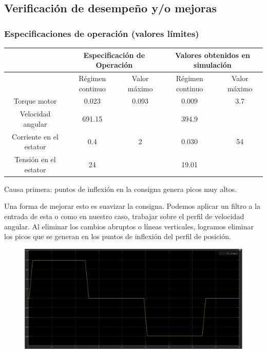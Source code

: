 \documentclass{article}
\begin{document}

\subsection{Verificación de desempeño y/o mejoras}


\subsubsection{Especificaciones de operación (valores límites)}

\begin{center}
    \begin{tabular}{|c|c|c|c|c|}
        \hline
         & \multicolumn{2}{c|}{Especificación de Operación} & \multicolumn{2}{c|}{Valores obtenidos en simulación} \\
        \hline
         & Régimen continuo & Valor máximo & Régimen continuo & Valor máximo \\
        \hline
        Torque motor & 0.023 & 0.093 & 0.009 & 3.7 \\
        \hline
        Velocidad angular & 691.15 &  & 394.9 &  \\
        \hline
        Corriente en el estator & 0.4 & 2 & 0.030 & 54 \\
        \hline
        Tensión en el estator & 24 &  & 19.01 &\\
        \hline
    \end{tabular}
\end{center}

Causa primera: puntos de inflexión en la consigna genera picos muy altos.

Una forma de mejorar esto es suavizar la consigna. Podemos aplicar un filtro a la entrada de esta 
o como en nuestro caso, trabajar sobre el perfil de velocidad angular. Al eliminar los cambios 
abruptos o líneas verticales, logramos eliminar los picos que se generan en los puntos de 
inflexión del perfil de posición.

\begin{figure}[H]
    \centering
    \includegraphics[width=1\textwidth]{5.2..5.1.a.1.png}
\end{figure}
\end{document}
